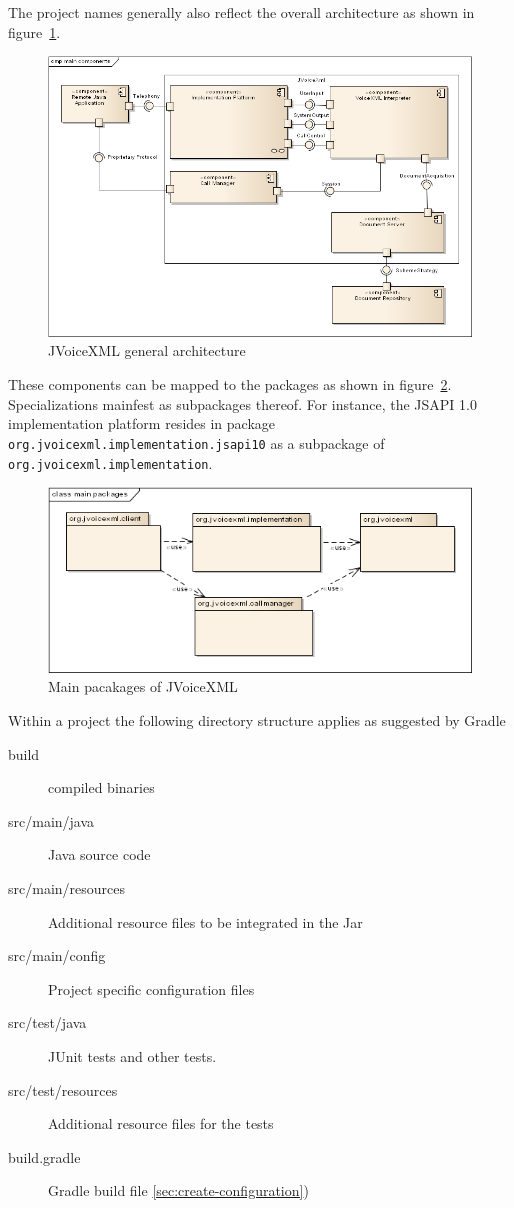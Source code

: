 \documentclass[11pt,a4paper]{article}
\begin{document}
The project names generally also reflect the overall architecture as shown in
figure~\ref{fig:main-components}.
\begin{figure}
\includegraphics[width=\linewidth]{main-components.png}
\caption{JVoiceXML general architecture}
\label{fig:main-components}
\end{figure}
These components can be mapped to the packages as shown in
figure~\ref{fig:main-packages}. Specializations mainfest as subpackages thereof.
For instance, the JSAPI 1.0 implementation platform resides in package 
\lstinline{org.jvoicexml.implementation.jsapi10} as a subpackage of
\lstinline{org.jvoicexml.implementation}.
\begin{figure}
\includegraphics[width=\linewidth]{main-packages.png}
\caption{Main pacakages of JVoiceXML}
\label{fig:main-packages}
\end{figure}


Within a project the following directory structure applies as suggested by
Gradle

\begin{description}
\item[build] compiled binaries
\item[src/main/java] Java source code
\item[src/main/resources] Additional resource files to be integrated in the Jar
\item[src/main/config] Project specific configuration files
\item[src/test/java] JUnit tests and other tests.
\item[src/test/resources]  Additional resource files for the tests
\item[build.gradle] Gradle build file
\ref{sec:create-configuration})
\end{description}
\end{document}

